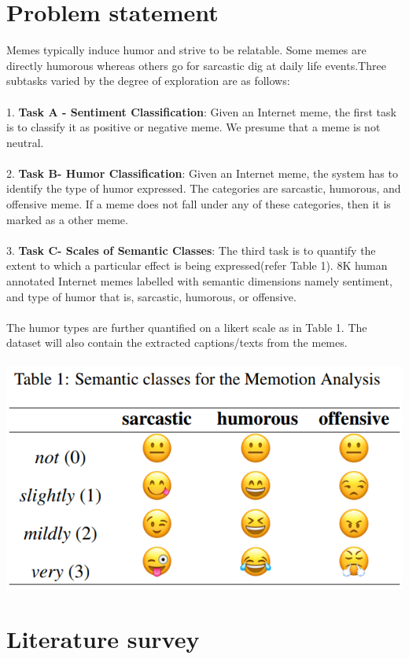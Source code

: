 \documentclass[12pt,a4paper]{article}
\begin{document}
\section{Problem statement}
Memes typically induce humor and strive to be relatable. Some
memes are directly humorous whereas others go for sarcastic dig at
daily life events.Three subtasks varied by the degree of exploration
are as follows:\\~\\
1. \textbf{ Task A - Sentiment Classification}: Given an Internet meme, the first task is to classify it as positive or negative meme. We presume that a meme is not neutral.\\~\\
2. \textbf{ Task B- Humor Classification}: Given an Internet meme, the system has to identify the type of humor expressed. The categories are sarcastic, humorous, and offensive meme. If a meme does not fall under any of these categories, then it is marked as a other meme.\\~\\
3.\textbf{ Task C- Scales of Semantic Classes}: The third task is to quantify the extent to which a particular effect is being expressed(refer Table 1).
\newpage
8K human annotated Internet memes labelled with semantic dimensions namely sentiment, and type of humor that is, sarcastic, humorous, or offensive. 
\\~\\The humor types are further quantified on a likert scale as in Table 1. The dataset will also contain the extracted captions/texts from the memes.
\\~\\
\includegraphics[scale=0.61]{semanticClass.png}
\section{Literature survey}
\end{document}
